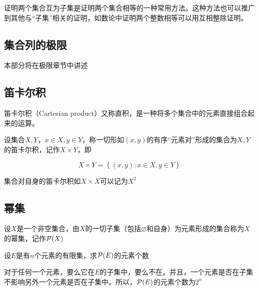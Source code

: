 \begin{remark}
    证明两个集合互为子集是证明两个集合相等的一种常用方法。这种方法也可以推广到其他与“子集”相关的证明，如数论中证明两个整数相等可以用互相整除证明。
\end{remark}

\subsection*{集合列的极限}

本部分将在极限章节中讲述

\subsection{笛卡尔积}

笛卡尔积（Cartesian product）又称直积，是一种将多个集合中的元素直接组合起来的运算。

\begin{definition}
    设集合$X,Y$，$x\in X,y\in Y$，称一切形如$(x,y)$的有序“元素对”形成的集合为$X,Y$的笛卡尔积，记作$X\times Y$，即

    \begin{equation*}
        X\times Y=\left\{(x,y):x\in X,y\in Y \right\}
    \end{equation*}

    集合对自身的笛卡尔积如$X\times X$可以记为$X^2$
\end{definition}

\subsection{幂集}

\begin{definition}
    设$X$是一个非空集合，由$X$的一切子集（包括$\varnothing$和自身）为元素形成的集合称为$X$的幂集，记作$\mathcal{P}(X)$
\end{definition}

\begin{example}
    设$E$是有$n$个元素的有限集，求$\mathcal{P}(E)$的元素个数
\end{example}

对于任何一个元素，要么它在$E$的子集中，要么不在。并且，一个元素是否在子集不影响另外一个元素是否在子集中。所以，$\mathcal{P}(E)$的元素个数为$2^n$